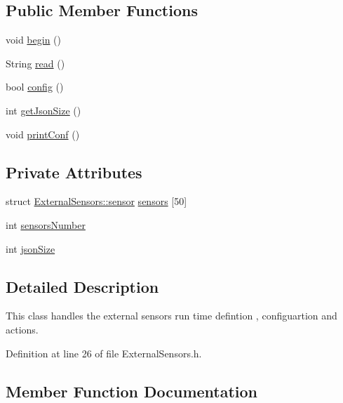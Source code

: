 \subsection*{Public Member Functions}
\begin{DoxyCompactItemize}
\item 
void \hyperlink{classExternalSensors_a58ede0d786a86417254708870f04a21e}{begin} ()
\item 
String \hyperlink{classExternalSensors_a53177b81eca3be89508b5511ddcd00fc}{read} ()
\item 
bool \hyperlink{classExternalSensors_a862a4bd11346b37270d0244c2adabe5a}{config} ()
\item 
int \hyperlink{classExternalSensors_a8e3a93efa8f5a0477f300e26084b6625}{get\+Json\+Size} ()
\item 
void \hyperlink{classExternalSensors_a78c2bf55084435dd51d3c559b2d3c6f3}{print\+Conf} ()
\end{DoxyCompactItemize}
\subsection*{Private Attributes}
\begin{DoxyCompactItemize}
\item 
struct \hyperlink{structExternalSensors_1_1sensor}{External\+Sensors\+::sensor} \hyperlink{classExternalSensors_a284233f884fcf00154a44740cf1d9e1e}{sensors} \mbox{[}50\mbox{]}
\item 
int \hyperlink{classExternalSensors_a58e4fbf9adeae787d92be5fa33043b5d}{sensors\+Number}
\item 
int \hyperlink{classExternalSensors_acacea86d74d967b57fcff282d26cff57}{json\+Size}
\end{DoxyCompactItemize}


\subsection{Detailed Description}
This class handles the external sensors run time defintion , configuartion and actions. 

Definition at line 26 of file External\+Sensors.\+h.



\subsection{Member Function Documentation}
\mbox{\label{classExternalSensors_a58ede0d786a86417254708870f04a21e}} 
